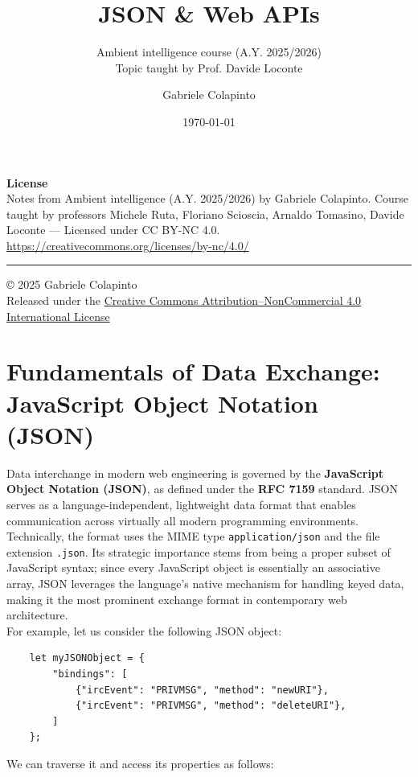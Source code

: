 \documentclass{scrbook}
\title{JSON \& Web APIs}
\subtitle{Ambient intelligence course (A.Y. 2025/2026)\\Topic taught by Prof. Davide Loconte}
\author{Gabriele Colapinto}
\date{\today}
\begin{document}
	
	\maketitle
	\thispagestyle{empty}
	
	{\Large\textbf{License}} \\
	{Notes from Ambient intelligence (A.Y. 2025/2026) by Gabriele Colapinto. 
		Course taught by professors Michele Ruta, Floriano Scioscia, Arnaldo Tomasino, Davide Loconte — 
		Licensed under CC BY-NC 4.0.\\
		\url{https://creativecommons.org/licenses/by-nc/4.0/}}
	
	\vspace*{\fill}
	\rule{\textwidth}{0.2pt}
	\small{© 2025 Gabriele Colapinto \\
		Released under the \href{https://creativecommons.org/licenses/by-nc/4.0/}{Creative Commons Attribution–NonCommercial 4.0 International License}}
	
	\clearpage
	
	\tableofcontents
	
	\chapter{Fundamentals of Data Exchange: JavaScript Object Notation (JSON)}
	
	Data interchange in modern web engineering is governed by the \textbf{JavaScript Object Notation (JSON)}, as defined under the \textbf{RFC 7159} standard. JSON serves as a language-independent, lightweight data format that enables communication across virtually all modern programming environments. Technically, the format uses the MIME type \texttt{application/json} and the file extension \texttt{.json}. Its strategic importance stems from being a proper subset of JavaScript syntax; since every JavaScript object is essentially an associative array, JSON leverages the language's native mechanism for handling keyed data, making it the most prominent exchange format in contemporary web architecture.\\
	
	For example, let us consider the following JSON object:
	
	\begin{lstlisting}
	let myJSONObject = {
		"bindings": [
			{"ircEvent": "PRIVMSG", "method": "newURI"},
			{"ircEvent": "PRIVMSG", "method": "deleteURI"},
		]
	};
	\end{lstlisting}
	
	We can traverse it and access its properties as follows:
	
\end{document}
